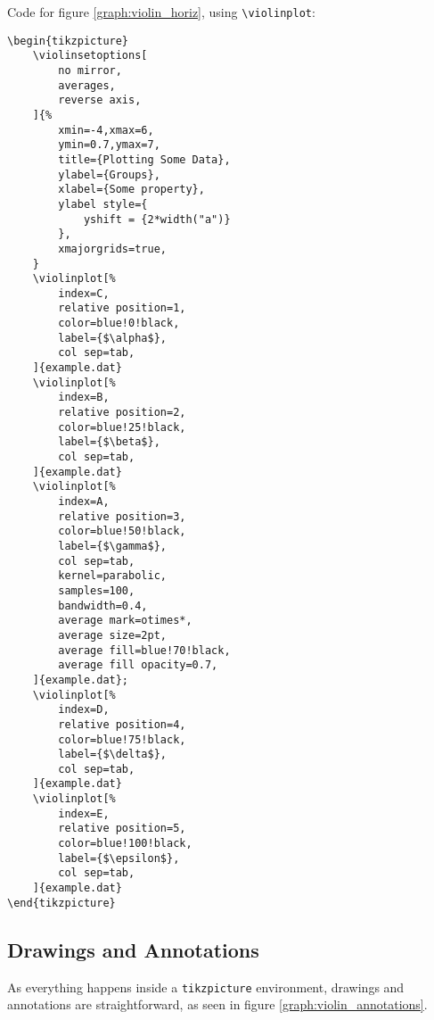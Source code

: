\documentclass{article}
\begin{document}
Code for figure \ref{graph:violin_horiz}, using
\texttt{{\textbackslash}violinplot}:


\begin{verbatim}
\begin{tikzpicture}
	\violinsetoptions[
		no mirror,
		averages,
		reverse axis,
	]{%
		xmin=-4,xmax=6,
		ymin=0.7,ymax=7,
		title={Plotting Some Data},
		ylabel={Groups},
		xlabel={Some property},
		ylabel style={
			yshift = {2*width("a")}
		},
		xmajorgrids=true,
	}
	\violinplot[%
		index=C,
		relative position=1,
		color=blue!0!black,
		label={$\alpha$},
		col sep=tab,
	]{example.dat}
	\violinplot[%
		index=B,
		relative position=2,
		color=blue!25!black,
		label={$\beta$},
		col sep=tab,
	]{example.dat}
	\violinplot[%
		index=A,
		relative position=3,
		color=blue!50!black,
		label={$\gamma$},
		col sep=tab,
		kernel=parabolic,
		samples=100,
		bandwidth=0.4,
		average mark=otimes*,
		average size=2pt,
		average fill=blue!70!black,
		average fill opacity=0.7,
	]{example.dat};
	\violinplot[%
		index=D,
		relative position=4,
		color=blue!75!black,
		label={$\delta$},
		col sep=tab,
	]{example.dat}
	\violinplot[%
		index=E,
		relative position=5,
		color=blue!100!black,
		label={$\epsilon$},
		col sep=tab,
	]{example.dat}
\end{tikzpicture}
\end{verbatim}

\subsection{Drawings and Annotations}

As everything happens inside a \texttt{tikzpicture} environment, drawings
and annotations are straightforward, as seen in figure \ref{graph:violin_annotations}.
\end{document}
